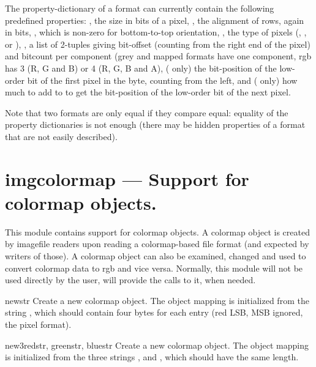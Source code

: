 The property-dictionary  of a format can currently contain
the following predefined properties:
, the size in bits of a pixel,
, the alignment of rows, again in bits,
, which is non-zero for bottom-to-top orientation,
, the type of pixels (, ,
 or ),
, a list of 2-tuples giving bit-offset (counting from the
right end of the pixel) and bitcount per component (grey and mapped
formats have one component, rgb has 3 (R, G and B) or 4 (R, G, B and
A),
 ( only) the bit-position of the low-order
bit of the first pixel in the byte, counting from the left, and
 ( only) how much to add to  to
get the bit-position of the low-order bit of the next pixel.

Note that two formats are only equal if they compare equal: equality
of the property dictionaries is not enough (there may be hidden
properties of a format that are not easily described).

\section{imgcolormap ---
	Support for colormap objects.}

This module contains support for colormap objects. A colormap object
is created by imagefile readers upon reading a colormap-based file
format (and expected by writers of those). A colormap object can also
be examined, changed and used to convert colormap data to rgb
and vice versa. Normally, this module will not be used directly by the
user,  will provide the calls to it, when needed.

\begin{funcdesc}{new}{str}
Create a new colormap object. The object mapping is initialized from
the string , which should contain four bytes for each entry
(red LSB, MSB ignored, the  pixel format).
\end{funcdesc}

\begin{funcdesc}{new3}{redstr, greenstr, bluestr}
Create a new colormap object. The object mapping is initialized from
the three strings ,  and ,
which should have the same length.
\end{funcdesc}

